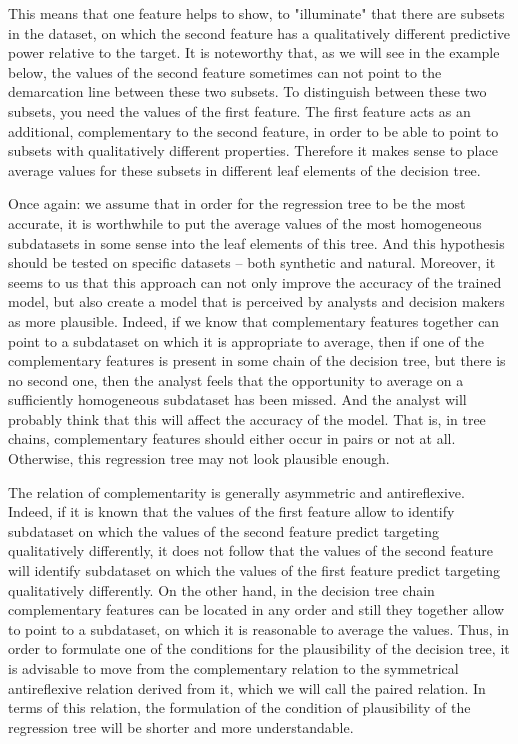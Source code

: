 \documentclass[conference]{IEEEtran}
\theoremstyle{definition}
\begin{document}
This means that one feature helps to show, to "illuminate" that there are subsets in the dataset, on which the second feature has a qualitatively different predictive power relative to the target. It is noteworthy that, as we will see in the example below, the values of the second feature sometimes can not point to the demarcation line between these two subsets. To distinguish between these two subsets, you need the values of the first  feature. The first feature acts as an additional, complementary to the second feature, in order to be able to point to subsets with qualitatively different properties. Therefore it makes sense to place average values for these subsets in different leaf elements of the decision tree.


Once again: we assume that in order for the regression tree to be the most accurate, it is worthwhile to put the average values of the most homogeneous subdatasets in some sense into the leaf elements of this tree. And this hypothesis should be tested on specific datasets -- both synthetic and natural. Moreover, it seems to us that this approach can not only improve the accuracy of the trained model, but also create a model that is perceived by analysts and decision makers as more plausible. Indeed, if we know that complementary features together can point to a subdataset on which it is appropriate to average, then if one of the complementary features is present in some chain of the decision tree, but there is no second one, then the analyst feels that the opportunity to average on a sufficiently homogeneous subdataset has been missed. And the analyst will probably think that this will affect the accuracy of the model. That is, in tree chains, complementary features should either occur in pairs or not at all. Otherwise, this regression tree may not look plausible enough.


The relation of complementarity is generally asymmetric and antireflexive. Indeed, if it is known that the values of the first feature allow to identify subdataset on which the values of the second feature predict targeting qualitatively differently, it does not follow that the values of the second feature will identify subdataset on which the values of the first feature predict targeting qualitatively differently. On the other hand, in the decision tree chain complementary features can be located in any order and still they together allow to point to a subdataset, on which it is reasonable to average the values. Thus, in order to formulate one of the conditions for the plausibility of the decision tree, it is advisable to move from the complementary relation to the symmetrical antireflexive relation derived from it, which we will call the paired relation. In terms of this relation, the formulation of the condition of plausibility of the regression tree will be shorter and more understandable.
\end{document}

